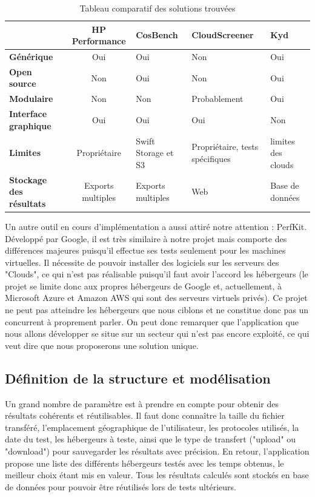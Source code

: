 \documentclass[10pt]{article}
\begin{document}
\begin{table}[h]
\caption{Tableau comparatif des solutions trouvées}
\renewcommand{\arraystretch}{1.5}
\begin{center}
\begin{tabular}{|p{2cm}|c|p{2cm}|p{3cm}|p{2cm}|}
 \hline
     & \bf HP Performance & \bf CosBench & \bf CloudScreener & \bf Kyd  \\
 \hline
 \bf\centering Générique & Oui & Oui & Non & Oui \\
 \hline
  \bf\centering Open source & Non & Oui & Non & Oui \\
 \hline
  \bf\centering Modulaire & Non & Non & Probablement & Oui \\
 \hline
  \bf\centering Interface graphique & Oui & Oui & Oui & Non \\
 \hline
  \bf\centering Limites & Propriétaire & Swift Storage et S3 & Propriétaire, tests spécifiques & limites des clouds \\
 \hline
  \bf\centering Stockage des résultats & Exports multiples & Exports multiples & Web & Base de données \\
 \hline
\end{tabular}
\end{center}
\end{table}

Un autre outil en cours d'implémentation a aussi attiré notre
attention : PerfKit. Développé par Google, il est très similaire à
notre projet mais comporte des différences majeures puisqu'il effectue
ses tests seulement pour les machines virtuelles. Il nécessite de
pouvoir installer des logiciels sur les serveurs des "Clouds", ce qui
n'est pas réalisable puisqu'il faut avoir l'accord les hébergeurs (le
projet se limite donc aux propres hébergeurs de Google et,
actuellement, à Microsoft Azure et Amazon AWS qui sont des serveurs
virtuels privés). Ce projet ne peut pas atteindre les hébergeurs que
nous ciblons et ne constitue donc pas un concurrent à proprement
parler. On peut donc remarquer que l’application que nous allons
développer se situe sur un secteur qui n’est pas encore exploité, ce
qui veut dire que nous proposerons une solution unique.

\subsection{Définition de la structure et modélisation}

Un grand nombre de paramètre est à prendre en compte pour obtenir des
résultats cohérents et réutilisables. Il faut donc connaître la taille
du fichier transféré, l'emplacement géographique de l'utilisateur, les
protocoles utilisés, la date du test, les hébergeurs à teste, ainsi
que le type de transfert ("upload" ou "download") pour sauvegarder les
résultats avec précision. En retour, l'application propose une liste
des différents hébergeurs testés avec les temps obtenus, le meilleur
choix étant mis en valeur. Tous les résultats calculés sont stockés en
base de données pour pouvoir être réutilisés lors de tests ultérieurs.
\end{document}
